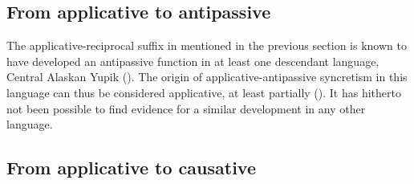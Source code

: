 \subsection{From applicative to antipassive} \label{diachrony:appl2antp}
The applicative-reciprocal suffix  in  mentioned in the previous section is known to have developed an antipassive function in at least one descendant language, Central Alaskan Yupik (). The origin of applicative-antipassive syncretism in this language can thus be considered applicative, at least partially (). It has hitherto not been possible to find evidence for a similar development in any other language.

\subsection{From applicative to causative} \label{diachrony:appl2caus}
